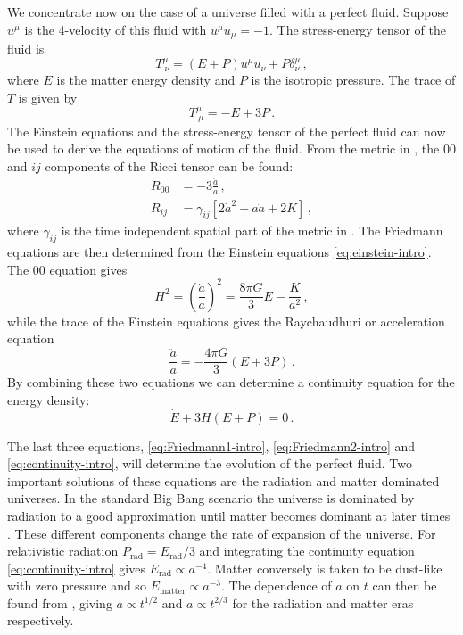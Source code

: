 We concentrate now on the case of a universe filled with a perfect
fluid. Suppose $u^\mu$ is the 4-velocity of this fluid with $u^\mu
u_\mu=-1$. The stress-energy tensor of the fluid is
% 
\begin{equation}
 \label{eq:fluidstress-intro}
  T^\mu_{~\nu} = (E + P)u^\mu u_\nu + P\delta^\mu_\nu \,,
\end{equation}
% 
where $E$ is the matter energy density and $P$ is the isotropic pressure.
The trace of $T$ is given by
% 
\begin{equation}
 \label{eq:Ttrace-intro}
  T^\mu_{~\mu} = -E + 3P\,.
\end{equation}
% 
The Einstein equations and the stress-energy tensor of the
perfect fluid can now be used to derive the equations of motion of the fluid.
From the metric in , the $00$ and $ij$ components of the
Ricci tensor can be found:
% 
\begin{align}
\label{eq:Ricci00-intro}
 R_{00} &= -3 \frac{\ddot{a}}{a} \,,\\
\label{eq:Ricciij-intro}
 R_{ij} &= \gamma_{ij} \left[ 2\dot{a}^2 +
  a \ddot{a} + 2K \right] \,,
\end{align}
% 
where $\gamma_{ij}$ is the time independent spatial part of the metric in .
The Friedmann equations are then determined from the Einstein equations
\eqref{eq:einstein-intro}.
The $00$ equation gives
% 
\begin{equation}
 \label{eq:Friedmann1-intro}
 H^2 = \left(\frac{\dot{a}}{a}\right)^2 = \frac{8\pi G}{3} E - \frac{K}{a^2}\,,
\end{equation}
% 
while the trace of the Einstein equations gives the Raychaudhuri or
acceleration equation
% 
\begin{equation}
 \label{eq:Friedmann2-intro}
 \frac{\ddot{a}}{a}  = -\frac{4\pi G}{3}(E + 3P)\,.
\end{equation}
% 
By combining these two equations we can determine a continuity equation for the
energy density:
\begin{equation}
 \label{eq:continuity-intro}
 \dot{E} + 3H(E+P) = 0 \,.
\end{equation}


The last three equations, \eqref{eq:Friedmann1-intro},
\eqref{eq:Friedmann2-intro}
and \eqref{eq:continuity-intro}, will determine the evolution of the
perfect fluid. Two important solutions of these equations are
the radiation and
matter dominated universes. In the standard Big Bang scenario the universe is
dominated by radiation to a good approximation until matter becomes dominant
at later times \cite{book:kolbturner}. These different components
change the rate of expansion
of the universe. For relativistic radiation $P_\mathrm{rad}=E_\mathrm{rad}/3$
and integrating the continuity equation \eqref{eq:continuity-intro} gives
$E_\mathrm{rad}\propto a^{-4}$. Matter conversely is taken to be dust-like with
zero
pressure and so $E_\mathrm{matter}\propto a^{-3}$. The dependence of $a$ on $t$
can then be
found from , giving $a\propto t^{1/2}$ and $a\propto
t^{2/3}$ for the radiation and matter eras respectively.


